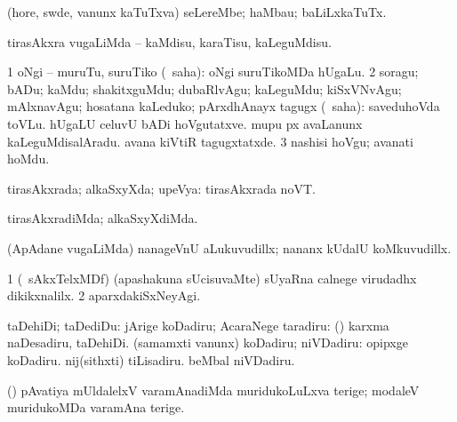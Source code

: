 {{{{{{\bentry
{} 
\gl{\nA}
\bmng
(hore, swde, \mo vanunx kaTuTxva) seLereMbe; haMbau; baLiLxkaTuTx. 
\emng
\eentry

\bentry
{} 
\gl{\sakirx}
\expl{}
\bmng
tirasAkxra \mo vugaLiMda -- kaMdisu, karaTisu, kaLeguMdisu. 
\emng

\noindent
\gl{\akirx}
\expl{}
\bmng
\bnum
\num{1} oNgi -- muruTu, suruTiko (\sakirx\ saha):  oNgi suruTikoMDa hUgaLu. 
\num{2} soragu; bADu; kaMdu; shakitxguMdu; dubaRlvAgu; kaLeguMdu; kiSxVNvAgu; mAlxnavAgu; hosatana kaLeduko; pArxdhAnayx tagugx (\sakirx\ saha):  saveduhoVda toVLu.  hUgaLU celuvU bADi hoVgutatxve.  mupu px avaLanunx kaLeguMdisalAradu.  avana kiVtiR tagugxtatxde. 
\num{3} nashisi hoVgu; avanati hoMdu. 
\enum
\emng
\eentry

\bentry
{} 
\gl{\gu}
\expl{}
\bmng
tirasAkxrada; alkaSxyXda; upeVya:  tirasAkxrada noVT. 
\emng
\eentry

\bentry
{} 
\gl{\kirxvi}
\expl{}
\bmng
tirasAkxradiMda; alkaSxyXdiMda. 
\emng
\eentry

\bentry
{} 
\gl{\nA}
\emng

\noindent
\gl{\pagu}
\expl{}
\bmng
{} (ApAdane \mo vugaLiMda) nanageVnU aLukuvudillx; nananx kUdalU koMkuvudillx. 
\emng
\eentry

\bentry
{} 
\gl{\kirxvi}
\expl{}
\bmng
\bnum
\num{1} (\kanmu\ sAkxTelxMDf) (apashakuna sUcisuvaMte) sUyaRna calnege virudadhx dikikxnalilx. 
\num{2} aparxdakiSxNeyAgi. 
\enum
\emng
\eentry

\bentry
{} 
\gl{\sakirx}
\bmng
taDehiDi; taDediDu: 
\banum
{} jArige koDadiru; AcaraNege taradiru:  (\pArxparx) karxma naDesadiru, taDehiDi. 
 (samamxti \mo vanunx) koDadiru; niVDadiru:  opipxge koDadiru.  nij(sithxti) tiLisadiru.  beMbal niVDadiru. 
\eanum
\emng

\noindent
\gl{\pagu}
\expl{}
\bmng
{} (\ame) pAvatiya mUldalelxV varamAnadiMda muridukoLuLxva terige; modaleV muridukoMDa varamAna terige. 
\emng
\eentry

}}}}}}
